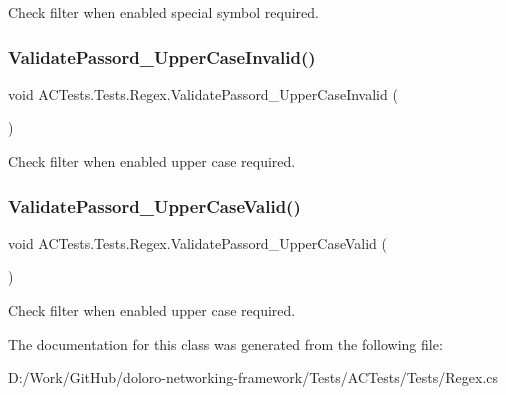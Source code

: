 Check filter when enabled special symbol required. 

\mbox{\label{class_a_c_tests_1_1_tests_1_1_regex_a04621729e38f6f113afca8c6bf109a43}} 
\subsubsection{\texorpdfstring{Validate\+Passord\+\_\+\+Upper\+Case\+Invalid()}{ValidatePassord\_UpperCaseInvalid()}}
{\footnotesize\ttfamily void A\+C\+Tests.\+Tests.\+Regex.\+Validate\+Passord\+\_\+\+Upper\+Case\+Invalid (\begin{DoxyParamCaption}{ }\end{DoxyParamCaption})}



Check filter when enabled upper case required. 

\mbox{\label{class_a_c_tests_1_1_tests_1_1_regex_afb5497f25802c0962c7197ac44356b47}} 
\subsubsection{\texorpdfstring{Validate\+Passord\+\_\+\+Upper\+Case\+Valid()}{ValidatePassord\_UpperCaseValid()}}
{\footnotesize\ttfamily void A\+C\+Tests.\+Tests.\+Regex.\+Validate\+Passord\+\_\+\+Upper\+Case\+Valid (\begin{DoxyParamCaption}{ }\end{DoxyParamCaption})}



Check filter when enabled upper case required. 



The documentation for this class was generated from the following file\+:\begin{DoxyCompactItemize}
\item 
D\+:/\+Work/\+Git\+Hub/doloro-\/networking-\/framework/\+Tests/\+A\+C\+Tests/\+Tests/Regex.\+cs\end{DoxyCompactItemize}

